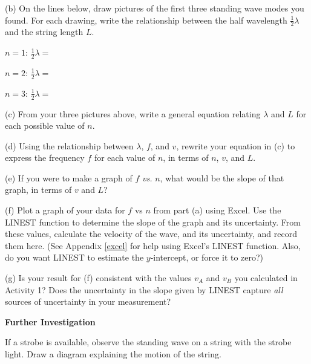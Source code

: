\pagebreak[3]

(b) On the lines below, draw pictures of the first three standing wave modes you found.  For each drawing, write the relationship between the half wavelength $\frac{1}{2}\lambda$ and the string length $L$.

\begin{center}
$n=1$: 
\raisebox{-0.15in}{\rule{3pt}{0.4in}}\raisebox{.05in}{\rule{2.5in}{0.1pt}}\raisebox{-0.15in}{\rule{3pt}{0.4in}}
\hspace{0.3in}$\frac{1}{2}\lambda=$

$n=2$:
\raisebox{-0.15in}{\rule{3pt}{0.4in}}\raisebox{.05in}{\rule{2.5in}{0.1pt}}\raisebox{-0.15in}{\rule{3pt}{0.4in}}
\hspace{0.3in}$\frac{1}{2}\lambda=$

$n=3$:
\raisebox{-0.15in}{\rule{3pt}{0.4in}}\raisebox{.05in}{\rule{2.5in}{0.1pt}}\raisebox{-0.15in}{\rule{3pt}{0.4in}}
\hspace{0.3in}$\frac{1}{2}\lambda=$
\end{center}

(c) From your three pictures above, write a general equation relating $\lambda$ and $L$ for each possible value of $n$.
\answerspace{2cm}

(d) Using the relationship between $\lambda$, $f$, and $v$, rewrite your equation in (c) to express the frequency $f$ for each value of $n$, in terms of $n$, $v$, and $L$.
\answerspace{2cm}

(e) If you were to make a graph of $f$ \textit{vs.} $n$, what would be the slope of that graph, in terms of $v$ and $L$?
\answerspace{2cm}

\pagebreak[3]
(f) Plot a graph of your data for $f$ vs $n$ from part (a) using Excel. Use the LINEST function to determine the slope of the graph and its uncertainty. From these values, calculate the velocity of the wave, and its uncertainty, and record them here. (See Appendix \ref{excel} for help using Excel's LINEST function.  Also, do you want LINEST to estimate the $y$-intercept, or force it to zero?)
\answerspace{4cm}

(g) Is your result for (f) consistent with the values $v_A$ and $v_B$ you calculated in Activity 1?  Does the uncertainty in the slope given by LINEST capture \textit{all} sources of uncertainty in your measurement?
\answerspace{4cm}


\textbf{Further Investigation}

If a strobe is available, observe the standing wave on a string with the 
strobe light. Draw a diagram explaining the motion of the string.




